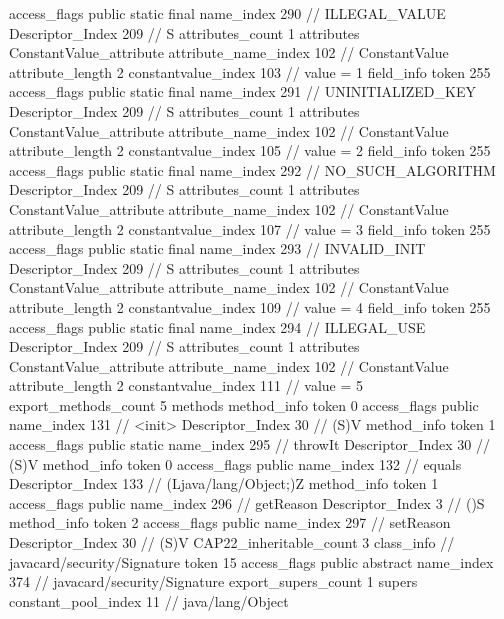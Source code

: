 {{{{{				access_flags	public static final
				name_index	290		// ILLEGAL_VALUE
				Descriptor_Index	209		// S
				attributes_count	1
				attributes {
				ConstantValue_attribute {
					attribute_name_index	102		// ConstantValue
					attribute_length	2
					constantvalue_index	103		// value = 1
				}
				}
			}
			field_info {
				token	255
				access_flags	public static final
				name_index	291		// UNINITIALIZED_KEY
				Descriptor_Index	209		// S
				attributes_count	1
				attributes {
				ConstantValue_attribute {
					attribute_name_index	102		// ConstantValue
					attribute_length	2
					constantvalue_index	105		// value = 2
				}
				}
			}
			field_info {
				token	255
				access_flags	public static final
				name_index	292		// NO_SUCH_ALGORITHM
				Descriptor_Index	209		// S
				attributes_count	1
				attributes {
				ConstantValue_attribute {
					attribute_name_index	102		// ConstantValue
					attribute_length	2
					constantvalue_index	107		// value = 3
				}
				}
			}
			field_info {
				token	255
				access_flags	public static final
				name_index	293		// INVALID_INIT
				Descriptor_Index	209		// S
				attributes_count	1
				attributes {
				ConstantValue_attribute {
					attribute_name_index	102		// ConstantValue
					attribute_length	2
					constantvalue_index	109		// value = 4
				}
				}
			}
			field_info {
				token	255
				access_flags	public static final
				name_index	294		// ILLEGAL_USE
				Descriptor_Index	209		// S
				attributes_count	1
				attributes {
				ConstantValue_attribute {
					attribute_name_index	102		// ConstantValue
					attribute_length	2
					constantvalue_index	111		// value = 5
				}
				}
			}
			}
			export_methods_count	5
			methods {
				method_info {
					token	0
					access_flags	public
					name_index	131		// <init>
					Descriptor_Index	30		// (S)V
				}
				method_info {
					token	1
					access_flags	public static
					name_index	295		// throwIt
					Descriptor_Index	30		// (S)V
				}
				method_info {
					token	0
					access_flags	public
					name_index	132		// equals
					Descriptor_Index	133		// (Ljava/lang/Object;)Z
				}
				method_info {
					token	1
					access_flags	public
					name_index	296		// getReason
					Descriptor_Index	3		// ()S
				}
				method_info {
					token	2
					access_flags	public
					name_index	297		// setReason
					Descriptor_Index	30		// (S)V
				}
			}
			CAP22_inheritable_count	3
		}
		class_info {		// javacard/security/Signature
			token	15
			access_flags	public abstract
			name_index	374		// javacard/security/Signature
			export_supers_count	1
			supers {
				constant_pool_index	11		// java/lang/Object
}}}}
